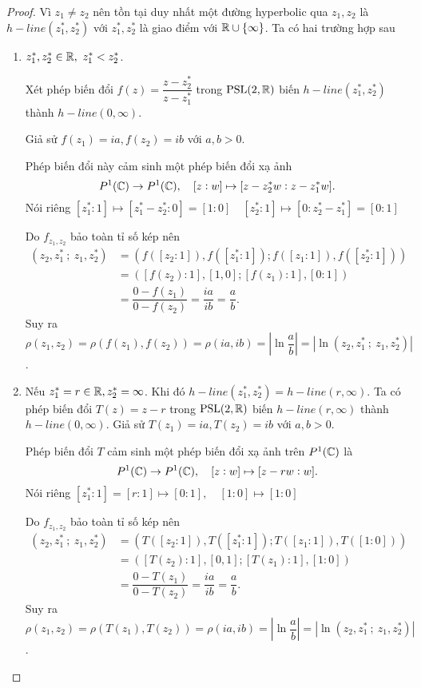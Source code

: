 \begin{proof}
    Vì $z_1 \neq z_2$ nên tồn tại duy nhất một đường hyperbolic qua $z_1,z_2$ là $h-line(z_1^*,z_2^*)$ với $z_1^*,z_2^*$ là giao điểm với $\mathbb{R}\cup\{\infty\}$. Ta có hai trường hợp sau
    \begin{enumerate}
        \item $z_1^*,z_2^* \in \mathbb{R},~z_1^*<z_2^*$.

        Xét phép biến đổi $f(z) = \dfrac{z-z_2^*}{z-z_1^*}$ trong $\operatorname{PSL}(2,\mathbb{R})$ biến $h-line(z_1^*,z_2^*)$ thành $h-line(0,\infty)$. 
        
        Giả sử $f(z_1) = ia, f(z_2) = ib$ với $a,b>0$.
        

        Phép biến đổi này cảm sinh một phép biến đổi xạ ảnh
        \[P^1(\mathbb{C}) \to P^1(\mathbb{C}),\quad [z:w]\mapsto [z-z_2^*w:z-z_1^*w].\]
        Nói riêng 
            $[z_1^*:1]\mapsto [z_1^*-z_2^*:0] = [1:0] \quad
            [z_2^*:1]\mapsto [0:z_2^*-z_1^*] = [0:1]$
        
        Do $f_{z_1,z_2}$ bảo toàn tỉ số kép nên
        \begin{align*}
         (z_2,z_1^*~;~z_1,z_2^*) 
         &= (f([z_2:1]),f([z_1^*:1]);f([z_1:1]),f([z_2^*:1])) \\
         &= ([f(z_2):1],[1,0];[f(z_1):1],[0:1])\\
         &= \dfrac{0-f(z_1)}{0-f(z_2)} = \dfrac{ia}{ib} = \dfrac{a}{b}.
        \end{align*}
        Suy ra $\rho(z_1,z_2) = \rho(f(z_1),f(z_2)) = \rho(ia,ib) = \left|\ln{\dfrac{a}{b}}\right| = |\ln{(z_2,z_1^*~;~z_1,z_2^*)}|$.

        \item Nếu $z_1^* = r \in \mathbb{R}, z_2^* = \infty$. Khi đó $h-line(z_1^*,z_2^*) = h-line(r,\infty)$. Ta có phép biến đổi $T(z) = z-r$ trong $\operatorname{PSL}(2,\mathbb{R})$ biến $h-line(r,\infty)$ thành $h-line(0,\infty)$. Giả sử $T(z_1) = ia, T(z_2) = ib$ với $a,b>0$.

        Phép biến đổi $T$ cảm sinh một phép biến đổi xạ ảnh trên $P^1(\mathbb{C})$ là 
        \[P^1(\mathbb{C}) \to P^1(\mathbb{C}),\quad [z:w]\mapsto [z-rw:w].\]
        Nói riêng 
            $[z_1^*:1] = [r:1]\mapsto [0:1], \quad
            [1:0]\mapsto [1:0]$
        
        Do $f_{z_1,z_2}$ bảo toàn tỉ số kép nên
        \begin{align*}
         (z_2,z_1^*~;~z_1,z_2^*) 
         &= (T([z_2:1]),T([z_1^*:1]);T([z_1:1]),T([1:0])) \\
         &= ([T(z_2):1],[0,1];[T(z_1):1],[1:0])\\
         &= \dfrac{0-T(z_1)}{0-T(z_2)} = \dfrac{ia}{ib} = \dfrac{a}{b}.
        \end{align*}
        Suy ra $\rho(z_1,z_2) = \rho(T(z_1),T(z_2)) = \rho(ia,ib) = \left|\ln{\dfrac{a}{b}}\right| = |\ln{(z_2,z_1^*~;~z_1,z_2^*)}|$.
    \end{enumerate}
    
\end{proof}
